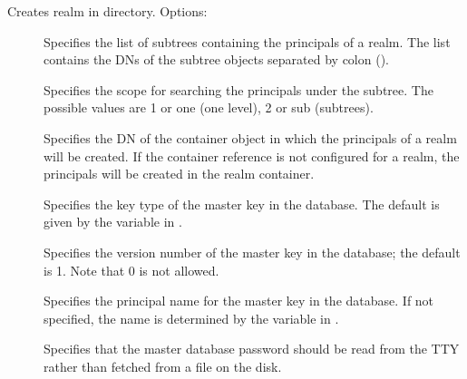 \documentclass[letterpaper,10pt,english]{sphinxmanual}
\begin{document}
\sphinxAtStartPar
Creates realm in directory. Options:
\begin{description}
\item[{ }] \leavevmode
\sphinxAtStartPar
Specifies the list of subtrees containing the principals of a
realm.  The list contains the DNs of the subtree objects separated
by colon (\sphinxcode{\sphinxupquote{:}}).

\item[{ }] \leavevmode
\sphinxAtStartPar
Specifies the scope for searching the principals under the
subtree.  The possible values are 1 or one (one level), 2 or sub
(subtrees).

\item[{ }] \leavevmode
\sphinxAtStartPar
Specifies the DN of the container object in which the principals
of a realm will be created.  If the container reference is not
configured for a realm, the principals will be created in the
realm container.

\item[{ }] \leavevmode
\sphinxAtStartPar
Specifies the key type of the master key in the database.  The
default is given by the  variable in
{\hyperref[\detokenize{admin/conf_files/kdc_conf:kdc-conf-5}]{}}.

\item[{ }] \leavevmode
\sphinxAtStartPar
Specifies the version number of the master key in the database;
the default is 1.  Note that 0 is not allowed.

\item[{ }] \leavevmode
\sphinxAtStartPar
Specifies the principal name for the master key in the database.
If not specified, the name is determined by the
 variable in {\hyperref[\detokenize{admin/conf_files/kdc_conf:kdc-conf-5}]{}}.

\item[{}] \leavevmode
\sphinxAtStartPar
Specifies that the master database password should be read from
the TTY rather than fetched from a file on the disk.


\end{description}
\end{document}
